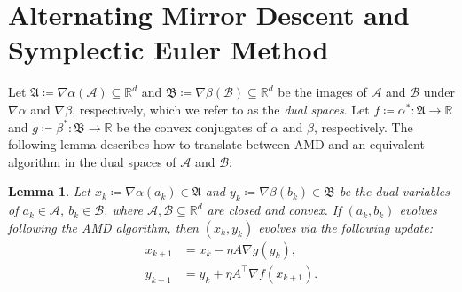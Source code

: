 \documentclass[11pt]{article}
\newtheorem{lemma}{Lemma}
\newcommand{\R}{\mathbb{R}}
\newcommand{\A}{\mathcal{A}}
\newcommand{\B}{\mathcal{B}}
\newcommand{\frA}{\mathfrak{A}}
\newcommand{\frB}{\mathfrak{B}}
\begin{document}
\section{Alternating Mirror Descent and Symplectic Euler Method} \label{primaldual}

Let $\frA\coloneqq \nabla\alpha\left(\A\right) \subseteq \R^d$ and $\frB\coloneqq \nabla\beta\left(\B\right) \subseteq \R^d$ be the images of $\mathcal{A}$ and $\mathcal{B}$ under $\nabla\alpha$ and $\nabla\beta$, respectively, which we refer to as the {\em dual spaces}. Let $f\coloneqq \alpha^{*} \colon \frA\rightarrow\R$ and $g\coloneqq \beta^{*} \colon\frB \rightarrow\R$ be the convex conjugates \citep[Section 26]{Rockafellar1996} of $\alpha$ and $\beta$, respectively. 
The following lemma describes how to translate between AMD and an equivalent algorithm in the dual spaces of $\A$ and $\B$:

\begin{lemma}
    Let $x_k \coloneqq  \nabla \alpha(a_k) \in \frA$ and $y_k \coloneqq  \nabla \beta(b_k) \in \frB$ be the dual variables of $a_k \in \A$, $b_k \in \B$, where $\A,\B\subseteq\R^d$ are closed and convex.
    If $(a_k, b_k)$ evolves following the AMD algorithm, then $\left(x_{k},y_{k}\right)$ evolves via the following update:
\begin{subequations}\label{DAMD}
    \begin{align}
    x_{k+1}&=x_{k}-\eta A\nabla g\left(y_{k}\right),\\
    y_{k+1}&=y_{k}+\eta A^{\top}\nabla f\left(x_{k+1}\right).
\end{align}
\end{subequations}
\end{lemma}
\end{document}
